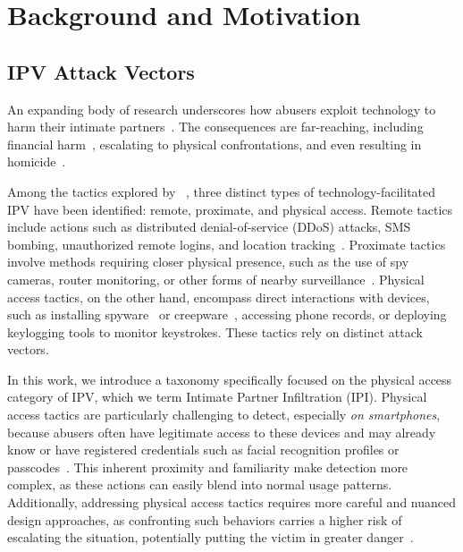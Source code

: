 \section{Background and Motivation}\label{sec-2-background}


\subsection{IPV Attack Vectors}

An expanding body of research underscores how abusers exploit technology to harm their intimate partners~\cite{tseng2020tools,tseng2022care,chatterjee2018spyware,freed2019my,freed2018stalker,freed2017digital,matthews2017stories}. The consequences are far-reaching, including financial harm~\cite{bellini2023paying}, escalating to physical confrontations, and even resulting in homicide~\cite{southworth2005high}.


Among the tactics explored by ~\cite{freed2018stalker,tseng2020tools,woodlock2017abuse,bellini2023digital,ceccio2023sneaky}, three distinct types of technology-facilitated IPV have been identified: remote, proximate, and physical access. Remote tactics include actions such as distributed denial-of-service (DDoS) attacks, SMS bombing, unauthorized remote logins, and location tracking~\cite{freed2018stalker,stephenson2023s}. Proximate tactics involve methods requiring closer physical presence, such as the use of spy cameras, router monitoring, or other forms of nearby surveillance~\cite{ceccio2023sneaky}. Physical access tactics, on the other hand, encompass direct interactions with devices, such as installing spyware~\cite{chatterjee2018spyware} or creepware~\cite{roundy2020many}, accessing phone records, or deploying keylogging tools to monitor keystrokes. These tactics rely on distinct attack vectors. 

In this work, we introduce a taxonomy specifically focused on the physical access category of IPV, which we term Intimate Partner Infiltration (IPI). Physical access tactics are particularly challenging to detect, especially \textit{on smartphones}, because abusers often have legitimate access to these devices and may already know or have registered credentials such as facial recognition profiles or passcodes~\cite{tseng2020tools}. This inherent proximity and familiarity make detection more complex, as these actions can easily blend into normal usage patterns. Additionally, addressing physical access tactics requires more careful and nuanced design approaches, as confronting such behaviors carries a higher risk of escalating the situation, potentially putting the victim in greater danger~\cite{matthews2017stories, southworth2005high,bellini2023paying}.


